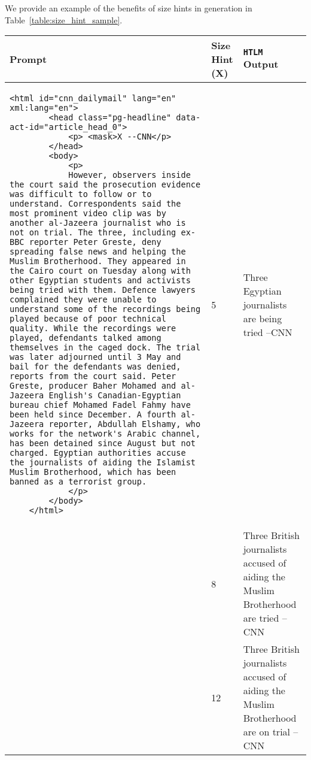 \documentclass[11pt,a4paper]{article}
\newcommand{\HTLM}{\texttt{HTLM}}
\begin{document}
We provide an example of the benefits of size hints in generation in Table~\ref{table:size_hint_sample}.

\begin{table*}[!htpb]
\centering
\begin{tabular}{p{8.3cm}p{2.0cm}p{4.6cm}}
\toprule
Prompt & Size Hint (X) & \HTLM{} Output \\ \midrule
        \begin{lstlisting}[numbers=none, basicstyle=\tiny\ttfamily, breaklines=true]
    <html id="cnn_dailymail" lang="en" xml:lang="en">
        <head class="pg-headline" data-act-id="article_head_0">
            <p> <mask>X --CNN</p>
        </head>
        <body>
            <p>
            However, observers inside the court said the prosecution evidence was difficult to follow or to understand. Correspondents said the most prominent video clip was by another al-Jazeera journalist who is not on trial. The three, including ex-BBC reporter Peter Greste, deny spreading false news and helping the Muslim Brotherhood. They appeared in the Cairo court on Tuesday along with other Egyptian students and activists being tried with them. Defence lawyers complained they were unable to understand some of the recordings being played because of poor technical quality. While the recordings were played, defendants talked among themselves in the caged dock. The trial was later adjourned until 3 May and bail for the defendants was denied, reports from the court said. Peter Greste, producer Baher Mohamed and al-Jazeera English's Canadian-Egyptian bureau chief Mohamed Fadel Fahmy have been held since December. A fourth al-Jazeera reporter, Abdullah Elshamy, who works for the network's Arabic channel, has been detained since August but not charged. Egyptian authorities accuse the journalists of aiding the Islamist Muslim Brotherhood, which has been banned as a terrorist group.
            </p>
        </body>
    </html>
    \end{lstlisting}  &     \vspace{1em} 5  & \vspace{1em} Three Egyptian journalists are being tried --CNN                         \\
        &       \vspace{-20em} 8                    & \vspace{-20em} Three British journalists accused of aiding the Muslim Brotherhood are tried --CNN      \\
       &         \vspace{-16em} 12                     & \vspace{-16em} Three British journalists accused of aiding the Muslim Brotherhood are on trial --CNN  \\ 

\end{tabular}
\end{table*}
\end{document}
